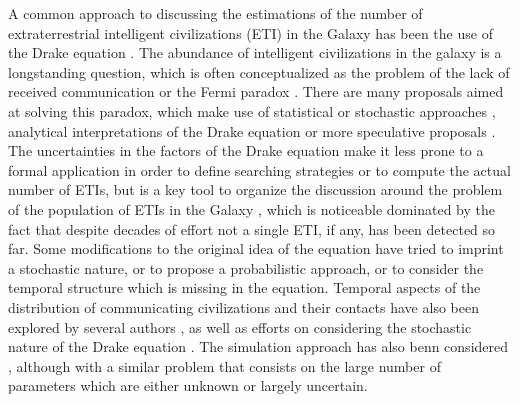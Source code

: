 \documentclass[crop]{CSLB}%
\begin{document}
A common approach to discussing the estimations of the number of
extraterrestrial intelligent civilizations (ETI) in the Galaxy has
been the use of the Drake equation \citep{gleiser_drake_2010,
prantzos_joint_2013, haqq-misra_drake_2017}.
%
The abundance of intelligent civilizations in the galaxy is a
longstanding question, which is often conceptualized as the problem of
the lack of received communication or the Fermi paradox
\citep{barlow_galactic_2012, Sotos_biotechnology_2019,
forgan_galactic_2016}.
%
There are many proposals aimed at solving this paradox, which make use
of statistical \citep{solomonides_probabilistic_2016,
vanhouten_isthere_2017, horvat_calculating_2007,
maccone_statistical_2015} or stochastic approaches
\citep{forgan_numerical_2009, bloetscher_using_2019,
glade_stochastic_2011, forgan_numerical_2010}, analytical
interpretations of the Drake equation \citep{prantzos_joint_2013,
smith_broadcasting_2009} or more speculative proposals
\citep{barlow_galactic_2013, lampton_information_2013,
conway_three_2018, forgan_galactic_2017}.
%
The uncertainties in the factors of the Drake equation make it less
prone to a formal application in order to define searching strategies
or to compute the actual number of ETIs, but is a key tool to organize
the discussion around the problem of the population of ETIs in the
Galaxy \citep{hinkel_interdisciplinary_2019}, which is noticeable
dominated by the fact that despite decades of effort not a single ETI,
if any, has been detected so far.
%
Some modifications to the original idea of the equation have tried to
imprint a stochastic nature, or to propose a probabilistic approach,
or to consider the temporal structure which is missing in the
equation.
%
Temporal aspects of the distribution of communicating civilizations
and their contacts have also been explored by several authors
\citep{fogg_temporal_1987, forgan_spatiotemporal_2011,
balbi_impact_2018, balb_spatiotemporal_2018, horvat_impact_2011},
%
as well as efforts on considering the stochastic nature of the Drake equation
\citep{glade_stochastic_2011}.
%
The simulation approach has also benn considered
\citep{forgan_evaluating_2015, vukotic_grandeur_2016,
murante_simulating_2015, forgan_numerical_2009, forgan_galactic_2017},
although with a similar problem that consists on the large number of
parameters which are either unknown or largely uncertain.
\end{document}
